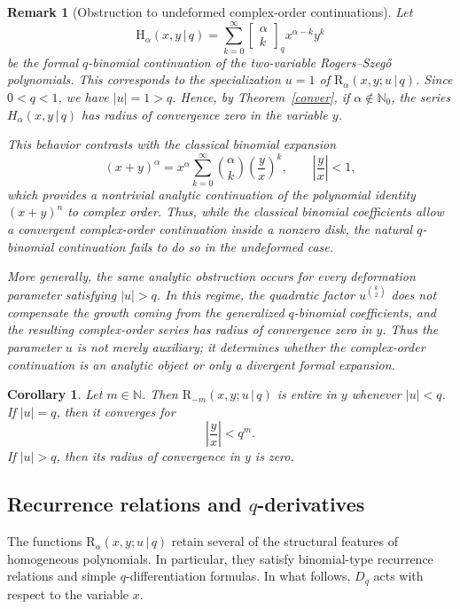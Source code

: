 \documentclass[12pt]{article}
\newcommand{\rr}{\mathrm{R}}
\newtheorem{corollary}{Corollary}
\newtheorem{remark}{Remark}
\begin{document}
\begin{remark}[Obstruction to undeformed complex-order continuations]
Let
\[
\mathrm{H}_{\alpha}(x,y\,|\,q)
=
\sum_{k=0}^{\infty}
\begin{bmatrix}
\alpha\\ k
\end{bmatrix}_q
x^{\alpha-k}y^k
\]
be the formal \(q\)-binomial continuation of the two-variable
Rogers--Szegő polynomials. This corresponds to the specialization
\(u=1\) of \(\rr_{\alpha}(x,y;u\,|\,q)\). Since \(0<q<1\), we have
\(|u|=1>q\). Hence, by Theorem~\ref{conver}, if
\(\alpha\notin\mathbb N_0\), the series \(H_{\alpha}(x,y\,|\,q)\)
has radius of convergence zero in the variable \(y\).

This behavior contrasts with the classical binomial expansion
\[
(x+y)^\alpha
=
x^\alpha
\sum_{k=0}^{\infty}
\binom{\alpha}{k}
\left(\frac{y}{x}\right)^k,
\qquad
\left|\frac{y}{x}\right|<1,
\]
which provides a nontrivial analytic continuation of the polynomial
identity \((x+y)^n\) to complex order. Thus, while the classical
binomial coefficients allow a convergent complex-order continuation
inside a nonzero disk, the natural \(q\)-binomial continuation fails to
do so in the undeformed case.

More generally, the same analytic obstruction occurs for every
deformation parameter satisfying \(|u|>q\). In this regime, the
quadratic factor \(u^{\binom{k}{2}}\) does not compensate the growth
coming from the generalized \(q\)-binomial coefficients, and the
resulting complex-order series has radius of convergence zero in \(y\). Thus the parameter \(u\) is not merely auxiliary; it determines whether the complex-order continuation is an analytic object or only a divergent formal expansion.

\end{remark}

\begin{corollary}
Let \(m\in\mathbb N\). Then \(\rr_{-m}(x,y;u\,|\,q)\) is entire in \(y\)
whenever \(|u|<q\). If \(|u|=q\), then it converges for
\[
\left|\frac{y}{x}\right|<q^m.
\]
If \(|u|>q\), then its radius of convergence in \(y\) is zero.
\end{corollary}

\subsection{Recurrence relations and \(q\)-derivatives}

The functions \(\rr_{\alpha}(x,y;u\,|\,q)\) retain several of the structural
features of homogeneous polynomials. In particular, they satisfy
binomial-type recurrence relations and simple \(q\)-differentiation
formulas. In what follows, \(D_q\) acts with respect to the variable \(x\).
\end{document}
